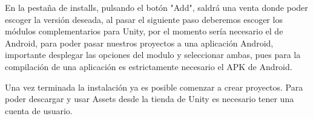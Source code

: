 En la pestaña de installs, pulsando el botón "Add", saldrá una venta donde poder escoger la versión deseada, al pasar el siguiente paso deberemos escoger los módulos complementarios para Unity, por el momento sería necesario el de Android, para poder pasar nuestros proyectos a una aplicación Android, importante desplegar las opciones del modulo y seleccionar ambas, pues para la compilación de una aplicación es estrictamente necesario el APK de Android.

Una vez terminada la instalación ya es posible comenzar a crear proyectos. 
Para poder descargar y usar Assets desde la tienda de Unity es necesario tener una cuenta de usuario.

